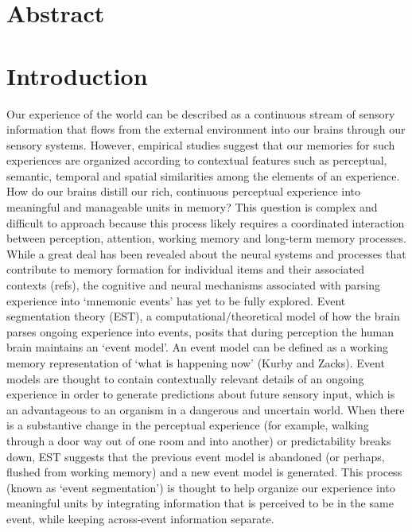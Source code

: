 \section{Abstract}\label{abstract}

\section{Introduction}\label{introduction}

Our experience of the world can be described as a continuous stream of
sensory information that flows from the external environment into our
brains through our sensory systems. However, empirical studies suggest
that our memories for such experiences are organized according to
contextual features such as perceptual, semantic, temporal and spatial
similarities among the elements of an experience. How do our brains
distill our rich, continuous perceptual experience into meaningful and
manageable units in memory? This question is complex and difficult to
approach because this process likely requires a coordinated interaction
between perception, attention, working memory and long-term memory
processes. While a great deal has been revealed about the neural systems
and processes that contribute to memory formation for individual items
and their associated contexts (refs), the cognitive and neural
mechanisms associated with parsing experience into `mnemonic events' has
yet to be fully explored. Event segmentation theory (EST), a
computational/theoretical model of how the brain parses ongoing
experience into events, posits that during perception the human brain
maintains an `event model'. An event model can be defined as a working
memory representation of `what is happening now' (Kurby and Zacks).
Event models are thought to contain contextually relevant details of an
ongoing experience in order to generate predictions about future sensory
input, which is an advantageous to an organism in a dangerous and
uncertain world. When there is a substantive change in the perceptual
experience (for example, walking through a door way out of one room and
into another) or predictability breaks down, EST suggests that the
previous event model is abandoned (or perhaps, flushed from working
memory) and a new event model is generated. This process (known as
`event segmentation') is thought to help organize our experience into
meaningful units by integrating information that is perceived to be in
the same event, while keeping across-event information separate.

